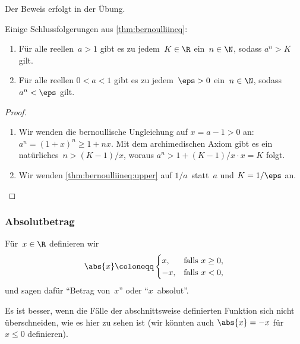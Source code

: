 \documentclass[a4paper]{article}
\begin{document}
Der Beweis erfolgt in der Übung.

Einige Schlussfolgerungen aus \cref{thm:bernoulliineq}:

\begin{theorem}\label{thm:archimedesbernoulli}\leavevmode
    \begin{enumerate}
        \item Für alle reellen~$a > 1$ gibt es zu jedem~$K \in \R$ ein~$n \in \N$, sodass $a^n > K$ gilt.\label{thm:bernoulliineq:upper}
        \item Für alle reellen $0 < a < 1$ gibt es zu jedem~$\eps > 0$ ein~$n \in \N$, sodass $a^n < \eps$ gilt.
    \end{enumerate}
\end{theorem}

\begin{proof}\leavevmode
    \begin{enumerate}
        \item Wir wenden die bernoullische Ungleichung auf $x = a - 1 > 0$ an: $a^n = (1 + x)^n \geq 1 + nx$. Mit dem archimedischen Axiom gibt es ein natürliches~$n > (K-1)/x$, woraus $a^n > 1 + (K-1)/x \cdot x = K$ folgt.
        \item Wir wenden \cref{thm:bernoulliineq:upper} auf $1/a$~statt~$a$ und $K = 1/\eps$ an.\qedhere
    \end{enumerate}
\end{proof}

\subsubsection{Absolutbetrag}

\begin{definition}[Absolutbetrag]
    Für~$x \in \R$ definieren wir
    \begin{equation*}
        \abs{x} \coloneqq \begin{cases}
            x,  & \text{falls } x \geq 0, \\
            -x, & \text{falls } x < 0,
        \end{cases}
    \end{equation*}
    und sagen dafür "`Betrag von~$x$"' oder "`$x$~absolut"'.
\end{definition}

Es ist besser, wenn die Fälle der abschnittsweise definierten Funktion sich nicht überschneiden, wie es hier zu sehen ist (wir könnten auch $\abs{x} = -x$ für~$x \leq 0$ definieren).
\end{document}
